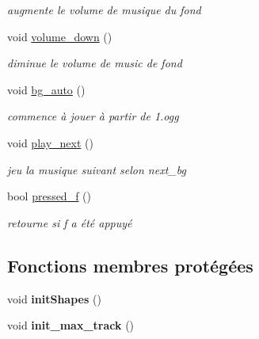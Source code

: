 \begin{DoxyCompactItemize}
\begin{DoxyCompactList}\small\item\em augmente le volume de musique du fond \end{DoxyCompactList}\item 
\mbox{\label{class_fenetre_s_f_m_l_a67a7e637a9a817e148dcd864a570a6a9}} 
void \mbox{\hyperlink{class_fenetre_s_f_m_l_a67a7e637a9a817e148dcd864a570a6a9}{volume\+\_\+down}} ()
\begin{DoxyCompactList}\small\item\em diminue le volume de music de fond \end{DoxyCompactList}\item 
\mbox{\label{class_fenetre_s_f_m_l_a7c3cea5c2aa43f08a1684d16f0ef96a1}} 
void \mbox{\hyperlink{class_fenetre_s_f_m_l_a7c3cea5c2aa43f08a1684d16f0ef96a1}{bg\+\_\+auto}} ()
\begin{DoxyCompactList}\small\item\em commence à jouer à partir de 1.\+ogg \end{DoxyCompactList}\item 
\mbox{\label{class_fenetre_s_f_m_l_a7ea91ef33ef2267d00ea06a6d2fb41f2}} 
void \mbox{\hyperlink{class_fenetre_s_f_m_l_a7ea91ef33ef2267d00ea06a6d2fb41f2}{play\+\_\+next}} ()
\begin{DoxyCompactList}\small\item\em jeu la musique suivant selon next\+\_\+bg \end{DoxyCompactList}\item 
\mbox{\label{class_fenetre_s_f_m_l_ab6df4095c365f23fc9c022c58519bf4f}} 
bool \mbox{\hyperlink{class_fenetre_s_f_m_l_ab6df4095c365f23fc9c022c58519bf4f}{pressed\+\_\+f}} ()
\begin{DoxyCompactList}\small\item\em retourne si f a été appuyé \end{DoxyCompactList}\end{DoxyCompactItemize}
\subsection*{Fonctions membres protégées}
\begin{DoxyCompactItemize}
\item 
\mbox{\label{class_fenetre_s_f_m_l_aab129bf54861fb3255d3cc0138aba636}} 
void {\bfseries init\+Shapes} ()
\item 
\mbox{\label{class_fenetre_s_f_m_l_afbc4ccdc13fc985ce6e5fd575dc1f632}} 
void {\bfseries init\+\_\+max\+\_\+track} ()
\end{DoxyCompactItemize}
